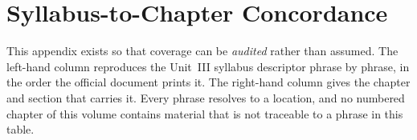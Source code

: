 
\startappendices

\chapter{Syllabus-to-Chapter Concordance}

This appendix exists so that coverage can be \emph{audited} rather than assumed.
The left-hand column reproduces the Unit~III syllabus descriptor phrase by
phrase, in the order the official document prints it. The right-hand column gives
the chapter and section that carries it. Every phrase resolves to a location, and
no numbered chapter of this volume contains material that is not traceable to a
phrase in this table.

